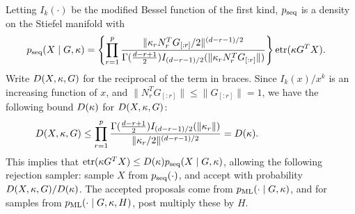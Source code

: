 Letting $I_k(\cdot)$ be the modified Bessel function of the first kind,
$\seq$ is a density on the Stiefel manifold with
\begin{align}
  \seq(X\mid G, \bkappa) &= \left\{\prod_{r=1}^p \frac{ \|\kappa_r N^T_r G_{[:r]}/2 \|^{(d-r-1)/2 }}{ \Gamma(\frac{d-r+1}{2} ) I_{(d-r-1)/2}(\| \kappa_r N^T_r G_{[:r]} \|)} \right\} \etr(\bkappa G^T X).
\end{align}
{Write $D(X, \kappa, G)$ for the reciprocal of the term in braces. Since
$I_k(x)/x^k$ is an increasing function of $x$, and  $\|N^T_r G_{[:r]}\| \le \|G_{[:r]}\| = 1$, we have the following bound $D(\kappa)$ for $D(X, \kappa, G)$:}
\begin{align}
 D(X,\kappa, G) &\le \prod_{r=1}^p  \frac{ \Gamma(\frac{d-r+1}{2} ) I_{(d-r-1)/2}(\| \kappa_r \|)}{ \|\kappa_r/2 \|^{(d-r-1)/2 }} = D(\kappa).\qquad \qquad \qquad \nonumber
\end{align}
This implies that $\etr(\bkappa G^T X) \le D(\bkappa) \seq(X\mid G,\bkappa) $, allowing
the following rejection sampler: sample $X$ from $\seq(\cdot)$, and accept with probability
$D(X, \kappa, G)/D(\kappa)$. The accepted proposals come from $\ml(\cdot\mid G,\bkappa)$, and for samples from $\ml(\cdot\mid G,\bkappa,H)$,
post multiply these by $H$.
